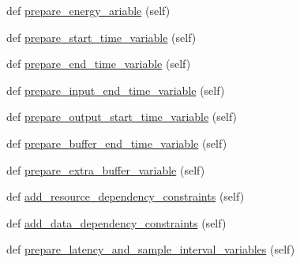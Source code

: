 \begin{DoxyCompactItemize}
def \hyperlink{classsylva_1_1dse_1_1dse__engine__v1_1_1dse__v1_ac142dcc94d773d58c58ecda20a7394cf}{prepare\+\_\+energy\+\_\+ariable} (self)
\item 
def \hyperlink{classsylva_1_1dse_1_1dse__engine__v1_1_1dse__v1_a69426d904171c2df3b58efeb675f5eab}{prepare\+\_\+start\+\_\+time\+\_\+variable} (self)
\item 
def \hyperlink{classsylva_1_1dse_1_1dse__engine__v1_1_1dse__v1_ad0a1caaafb4b13a64807f4e621a1649d}{prepare\+\_\+end\+\_\+time\+\_\+variable} (self)
\item 
def \hyperlink{classsylva_1_1dse_1_1dse__engine__v1_1_1dse__v1_a7fca76ea54e7cd9c26d6999ca4f48efb}{prepare\+\_\+input\+\_\+end\+\_\+time\+\_\+variable} (self)
\item 
def \hyperlink{classsylva_1_1dse_1_1dse__engine__v1_1_1dse__v1_a225a04af42165cc16fa445a81cc818a5}{prepare\+\_\+output\+\_\+start\+\_\+time\+\_\+variable} (self)
\item 
def \hyperlink{classsylva_1_1dse_1_1dse__engine__v1_1_1dse__v1_ae5ffc9ead2cb2e795efa2a4e9a824a42}{prepare\+\_\+buffer\+\_\+end\+\_\+time\+\_\+variable} (self)
\item 
def \hyperlink{classsylva_1_1dse_1_1dse__engine__v1_1_1dse__v1_ad197bd8cc0b39f0c76e6b255a1255d06}{prepare\+\_\+extra\+\_\+buffer\+\_\+variable} (self)
\item 
def \hyperlink{classsylva_1_1dse_1_1dse__engine__v1_1_1dse__v1_adb128ff5951fd6ee31c3709546491033}{add\+\_\+resource\+\_\+dependency\+\_\+constraints} (self)
\item 
def \hyperlink{classsylva_1_1dse_1_1dse__engine__v1_1_1dse__v1_ad7941fd1c459dd2be5608fc7ed68d779}{add\+\_\+data\+\_\+dependency\+\_\+constraints} (self)
\item 
def \hyperlink{classsylva_1_1dse_1_1dse__engine__v1_1_1dse__v1_aaf4998f28b186740af869957be403635}{prepare\+\_\+latency\+\_\+and\+\_\+sample\+\_\+interval\+\_\+variables} (self)
\end{DoxyCompactItemize}
